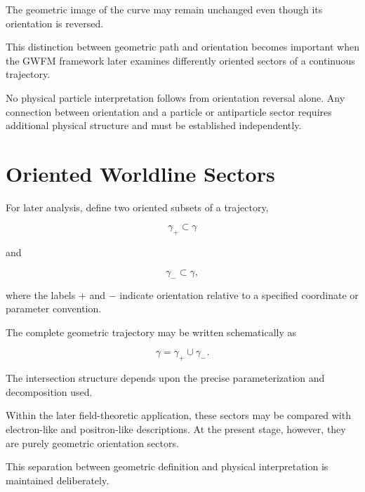\documentclass[12pt,oneside]{book}
\begin{document}
The geometric image of the curve may remain unchanged even
though its orientation is reversed.

This distinction between geometric path and orientation becomes
important when the GWFM framework later examines differently
oriented sectors of a continuous trajectory.

No physical particle interpretation follows from orientation
reversal alone. Any connection between orientation and a
particle or antiparticle sector requires additional physical
structure and must be established independently.


\section{Oriented Worldline Sectors}
\label{sec:worldline-sectors}

For later analysis, define two oriented subsets of a trajectory,

\begin{equation}
    \gamma_{+}
    \subset
    \gamma
\end{equation}

and

\begin{equation}
    \gamma_{-}
    \subset
    \gamma,
\end{equation}

where the labels \(+\) and \(-\) indicate orientation relative
to a specified coordinate or parameter convention.

The complete geometric trajectory may be written schematically
as

\begin{equation}
    \gamma
    =
    \gamma_{+}
    \cup
    \gamma_{-}.
    \label{eq:oriented-worldline-decomposition}
\end{equation}

The intersection structure depends upon the precise
parameterization and decomposition used.

Within the later field-theoretic application, these sectors may
be compared with electron-like and positron-like descriptions.
At the present stage, however, they are purely geometric
orientation sectors.

This separation between geometric definition and physical
interpretation is maintained deliberately.
\end{document}
